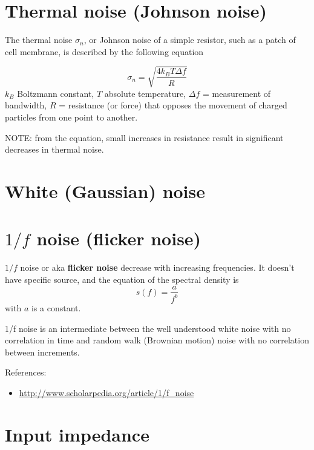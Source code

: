 \section{Thermal noise (Johnson noise)}
\label{sec:thermal-noise}

The thermal noise $\sigma_n$, or Johnson noise of a simple resistor, such as a
patch of cell membrane, is described by the following equation

\begin{equation}
\sigma_n = \sqrt{\frac{4k_BT \Delta f}{R}}
\end{equation}
$k_B$ Boltzmann constant, $T$ absolute temperature,
$\Delta f$ = measurement of bandwidth,
$R$ = resistance (or force) that opposes the movement of charged particles
from one point to another.

NOTE: from the equation, small increases in resistance result in significant
decreases in thermal noise.

\section{White (Gaussian) noise}
\label{sec:white-gaussian-noise}
\label{sec:gaussian-noise}


\section{$1/f$ noise (flicker noise)}
\label{sec:1f-noise}


$1/f$ noise or aka {\bf flicker noise} decrease with increasing
frequencies. It doesn't have specific source, and the equation of the
spectral density is
\begin{equation}
  \label{eq:902}
  s(f) = \frac{a}{f^b}
\end{equation}
with $a$ is a constant.

1/f noise is an intermediate between the well understood white noise
with no correlation in time and random walk (Brownian motion) noise
with no correlation between increments.

References:
\begin{itemize}
\item \url{http://www.scholarpedia.org/article/1/f_noise}
\end{itemize}

\section{Input impedance}
\label{sec:input-impedance}

